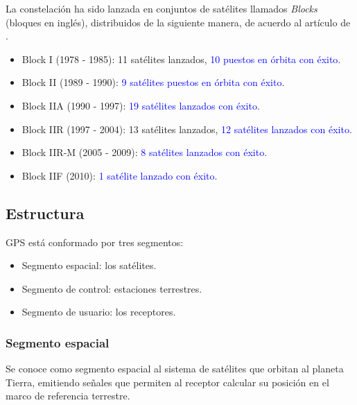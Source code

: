 La constelación ha sido lanzada en conjuntos de satélites llamados \textit{Blocks} (bloques en inglés), distribuidos de la siguiente manera, de acuerdo al artículo de \cite{termal2014prototipo}.

\begin{itemize}
	\item Block I (1978 - 1985): 11 satélites lanzados, \textcolor{blue}{10 puestos en órbita con éxito}.
	\item Block II (1989 - 1990): \textcolor{blue}{9 satélites puestos en órbita con éxito}.
	\item Block IIA (1990 - 1997): \textcolor{blue}{19 satélites lanzados con éxito}.
	\item Block IIR (1997 - 2004): 13 satélites lanzados, \textcolor{blue}{12 satélites lanzados con éxito}.
	\item Block IIR-M (2005 - 2009): \textcolor{blue}{8 satélites lanzados con éxito}.
	\item Block IIF (2010): \textcolor{blue}{1 satélite lanzado con éxito}.
\end{itemize}

\subsection{Estructura}

GPS está conformado por tres segmentos:

\begin{itemize}
	\item Segmento espacial: los satélites.
	\item Segmento de control: estaciones terrestres.
	\item Segmento de usuario: los receptores.
\end{itemize}
	
\subsubsection{Segmento espacial}

Se conoce como segmento espacial al sistema de satélites que orbitan al planeta Tierra, emitiendo señales que permiten al receptor calcular su posición en el marco de referencia terrestre. \\


